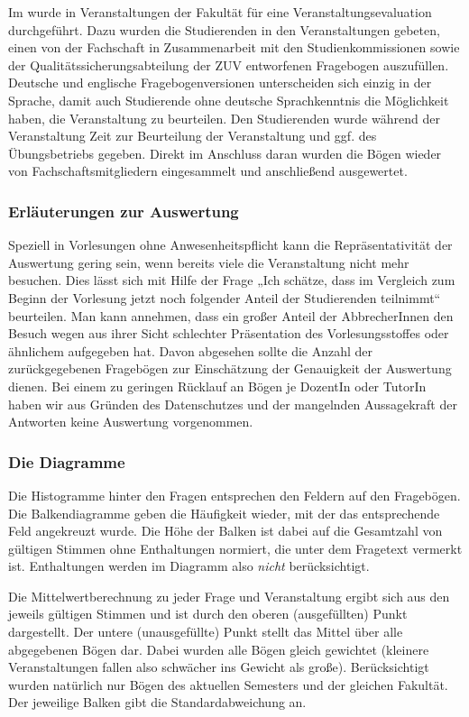 Im \semesterlong{} wurde in Veranstaltungen der Fakultät für \facultylong{} eine Veranstaltungsevaluation durchgeführt. Dazu wurden die Studierenden in den Veranstaltungen gebeten, einen von der Fachschaft in Zusammenarbeit mit den Studienkommissionen sowie der Qualitätssicherungsabteilung der ZUV entworfenen Fragebogen auszufüllen. Deutsche und englische Fragebogenversionen unterscheiden sich einzig in der Sprache, damit auch Studierende ohne deutsche Sprachkenntnis die Möglichkeit haben, die Veranstaltung zu beurteilen. Den Studierenden wurde während der Veranstaltung Zeit zur Beurteilung der Veranstaltung und ggf. des Übungsbetriebs gegeben. Direkt im Anschluss daran wurden die Bögen wieder von Fachschaftsmitgliedern eingesammelt und anschließend ausgewertet.


\subsubsection{Erläuterungen zur Auswertung}

Speziell in Vorlesungen ohne Anwesenheitspflicht kann die Repräsentativität der Auswertung gering sein, wenn bereits viele die Veranstaltung nicht mehr besuchen. Dies lässt sich mit Hilfe
der Frage  „Ich schätze, dass im Vergleich zum Beginn der Vorlesung jetzt noch folgender Anteil der Studierenden teilnimmt“ beurteilen. Man kann annehmen, dass ein großer Anteil der AbbrecherInnen den Besuch wegen aus ihrer Sicht schlechter Präsentation des Vorlesungsstoffes oder ähnlichem aufgegeben hat. Davon abgesehen sollte die Anzahl der zurückgegebenen Fragebögen zur Einschätzung der Genauigkeit der Auswertung dienen. Bei einem zu geringen Rücklauf an Bögen je DozentIn oder TutorIn haben wir aus Gründen des Datenschutzes und der mangelnden Aussagekraft der Antworten keine Auswertung vorgenommen.



\subsubsection{Die Diagramme}

Die Histogramme hinter den Fragen entsprechen den Feldern auf den Fragebögen. Die Balkendiagramme geben die Häufigkeit wieder, mit der das entsprechende Feld angekreuzt wurde. Die Höhe der Balken ist dabei auf die Gesamtzahl von gültigen Stimmen ohne Enthaltungen normiert, die unter dem Fragetext vermerkt ist. Enthaltungen werden im Diagramm also \emph{nicht} berücksichtigt.

Die Mittelwertberechnung zu jeder Frage und Veranstaltung ergibt sich aus den jeweils gültigen Stimmen und ist durch den oberen (ausgefüllten) Punkt dargestellt. Der untere (unausgefüllte) Punkt stellt das Mittel über alle abgegebenen Bögen dar. Dabei wurden alle Bögen gleich gewichtet (kleinere Veranstaltungen fallen also schwächer ins Gewicht als große). Berücksichtigt wurden natürlich nur Bögen des aktuellen Semesters und der gleichen Fakultät. Der
jeweilige Balken gibt die Standardabweichung an.

